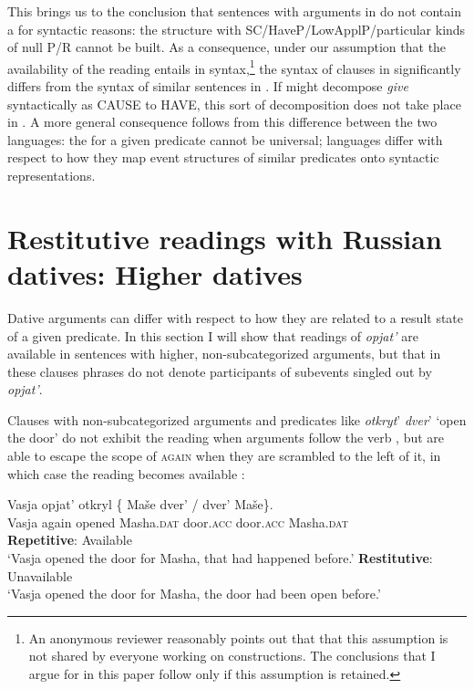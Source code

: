 \documentclass[output=paper]{langscibook}
\begin{document}
This brings us to the conclusion that  sentences with  arguments in  do not contain a  for syntactic reasons: the structure with SC\slash HaveP\slash LowApplP\slash particular kinds of null P/R cannot be built. As a consequence, under our assumption that the availability of the  reading entails  in syntax,\footnote{An anonymous reviewer reasonably points out that that this assumption is not shared by everyone working on  constructions. The conclusions that I argue for in this paper follow only if this assumption is retained.} the syntax of  clauses in  significantly differs from the syntax of similar sentences in . If  might decompose \textit{give} syntactically as CAUSE to HAVE, this sort of decomposition does not take place in . A more general consequence follows from this difference between the two languages: the  for a given predicate cannot be universal; languages differ with respect to how they map event structures of similar predicates onto syntactic representations.


\section{Restitutive readings with Russian datives: Higher datives}\label{s4}

Dative arguments can differ with respect to how they are related to a result state of a given predicate. In this section I will show that  readings of \textit{opjat’} are available in sentences with higher, non-subcategorized  arguments, but that in these clauses   phrases do not denote participants of  subevents singled out by \textit{opjat’}.

 
Clauses with non-subcategorized  arguments and predicates like \textit{otkryt}’ \textit{dver}’ ‘open the door’ do not exhibit the  reading when  arguments follow the verb , but are able to escape the scope of \textsc{again} when they are scrambled to the left of it, in which case the  reading becomes available :


 \ea\label{ex:bondarenko:31}
\gll Vasja opjat’ otkryl \{\hspace{-2pt} Maše dver’ / dver’ Maše\}.\\
     Vasja again opened {} Masha.\textsc{dat} door.\textsc{acc} {} door.\textsc{acc} Masha.\textsc{dat}\\
\ea \textbf{Repetitive}: Available\\
`Vasja opened the door for Masha, that had happened before.'
\ex  \textbf{Restitutive}: Unavailable\\
`Vasja opened the door for Masha, the door had been open   before.'
\z\z
\end{document}
